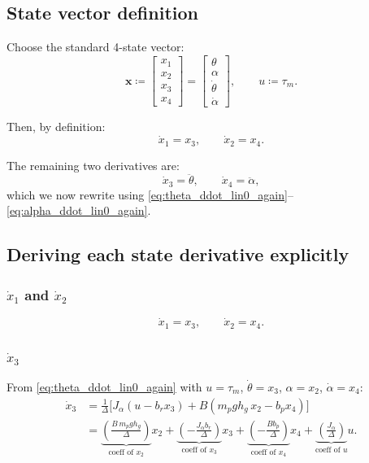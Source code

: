 \documentclass[12pt,a4paper]{article}
\begin{document}
\subsection{State vector definition}

Choose the standard 4-state vector:
\[
\bm x \coloneqq
\begin{bmatrix}
x_1\\x_2\\x_3\\x_4
\end{bmatrix}
=
\begin{bmatrix}
\theta\\ \alpha\\ \dot\theta\\ \dot\alpha
\end{bmatrix},
\qquad
u \coloneqq \tau_m.
\]

Then, by definition:
\[
\dot x_1 = x_3,
\qquad
\dot x_2 = x_4.
\]

The remaining two derivatives are:
\[
\dot x_3 = \ddot\theta,
\qquad
\dot x_4 = \ddot\alpha,
\]
which we now rewrite using \eqref{eq:theta_ddot_lin0_again}--\eqref{eq:alpha_ddot_lin0_again}.

\subsection{Deriving each state derivative explicitly}

\subsubsection{$\dot x_1$ and $\dot x_2$}

\[
\boxed{\dot x_1 = x_3,}
\qquad
\boxed{\dot x_2 = x_4.}
\]

\subsubsection{$\dot x_3$}

From \eqref{eq:theta_ddot_lin0_again} with $u=\tau_m$, $\dot\theta=x_3$, $\alpha=x_2$, $\dot\alpha=x_4$:
\begin{align*}
\dot x_3
&=
\frac{1}{\Delta}\Big[J_\alpha(u-b_r x_3)+B(m_p g h_g\,x_2-b_p x_4)\Big]\\[4pt]
&=
\underbrace{\left(\frac{B\,m_p g h_g}{\Delta}\right)}_{\text{coeff of }x_2}x_2
+\underbrace{\left(-\frac{J_\alpha b_r}{\Delta}\right)}_{\text{coeff of }x_3}x_3
+\underbrace{\left(-\frac{B b_p}{\Delta}\right)}_{\text{coeff of }x_4}x_4
+\underbrace{\left(\frac{J_\alpha}{\Delta}\right)}_{\text{coeff of }u}u.
\end{align*}
\end{document}

